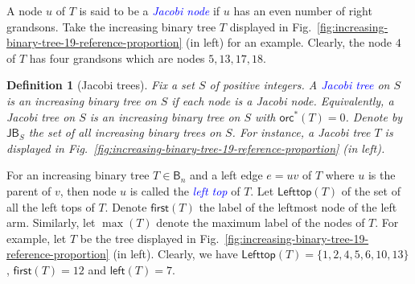 \documentclass[12pt]{article}
\def\blue{\textcolor{blue}}
\def\blue{\textcolor{blue}}
\numberwithin{equation}{section}
\def\blue{\textcolor{blue}}
\def\blue{\textcolor{blue}}
\theoremstyle{plain}
\newtheorem{definition}[theorem]{Definition}
\def\orc{\mathsf{orc}}
\def\Left{\mathsf{left}}
\def\B{\mathsf{B}}
\def\JB{\mathsf{JB}}
\def\first{\mathsf{first}}
\def\Lefttop{\mathsf{Lefttop}}
\begin{document}
 A node $u$ of $T$ is said to be a  \blue{\em Jacobi node} if $u$ has an even number of right grandsons.  Take the increasing  binary tree $T$ displayed in Fig.~\ref{fig:increasing-binary-tree-19-reference-proportion} (in left) for an example.  Clearly,   the node $4$ of $T$  has four grandsons  which are  nodes $5,13,17,18$.  
  
  \begin{definition}[Jacobi trees]
 	Fix a  set $S$ of positive integers.   A \blue{Jacobi tree}  on $S$ is an increasing binary tree on $S$  if each node   is a Jacobi node.   Equivalently,  a Jacobi tree  on $S$ is an increasing binary tree on $S$   with $\orc^{*}(T)=0$.
 	Denote by $\JB_S$ the set of all   increasing binary trees on $S$.  For instance, a Jacobi tree $T$ is displayed in Fig.~\ref{fig:increasing-binary-tree-19-reference-proportion}  (in left). 
 \end{definition}

   
  
  For an increasing binary tree $T\in \B_n$ and 
  a left edge $e=uv$  of $T$ where $u$ is the parent of $v$, then node $u$ is called the \blue{\em left top} of $T$.   Let $\Lefttop(T)$  of the set  of all the left tops   of $T$. 
Denote   $\first(T)$  the label of the leftmost  node of the left arm.  Similarly, let $\max(T)$ denote the maximum label of the nodes of $T$.  
  For example, let $T$ be the  tree displayed in Fig.~\ref{fig:increasing-binary-tree-19-reference-proportion} (in left).  Clearly, we have
  $\Lefttop(T)=\{1,2,4,5,6,10, 13\}$,    $\first(T)=12$ and $\Left(T)=7$. 
    
\end{document}

